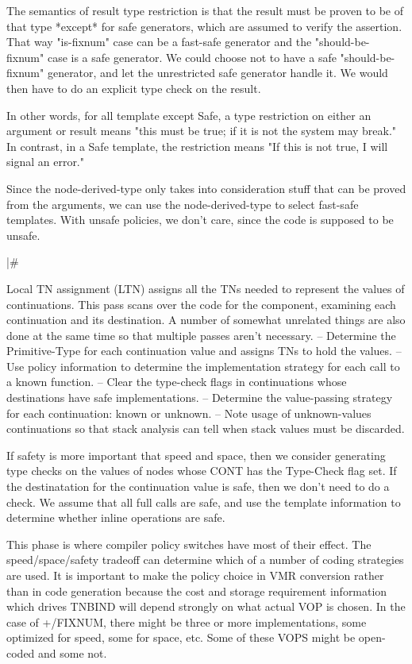     The semantics of result type restriction is that the result must be proven
    to be of that type *except* for safe generators, which are assumed to
    verify the assertion.  That way "is-fixnum" case can be a fast-safe
    generator and the "should-be-fixnum" case is a safe generator.  We could
    choose not to have a safe "should-be-fixnum" generator, and let the
    unrestricted safe generator handle it.  We would then have to do an
    explicit type check on the result.

    In other words, for all template except Safe, a type restriction on either
    an argument or result means "this must be true; if it is not the system may
    break."  In contrast, in a Safe template, the restriction means "If this is
    not true, I will signal an error."

    Since the node-derived-type only takes into consideration stuff that can be
    proved from the arguments, we can use the node-derived-type to select
    fast-safe templates.  With unsafe policies, we don't care, since the code
    is supposed to be unsafe.

|\#

Local TN assignment (LTN) assigns all the TNs needed to represent the values of
continuations.  This pass scans over the code for the component, examining each
continuation and its destination.  A number of somewhat unrelated things are
also done at the same time so that multiple passes aren't necessary.
 -- Determine the Primitive-Type for each continuation value and assigns TNs
    to hold the values.
 -- Use policy information to determine the implementation strategy for each
    call to a known function.
 -- Clear the type-check flags in continuations whose destinations have safe
    implementations.
 -- Determine the value-passing strategy for each continuation: known or
    unknown.
 -- Note usage of unknown-values continuations so that stack analysis can tell
    when stack values must be discarded.
 
If safety is more important that speed and space, then we consider generating
type checks on the values of nodes whose CONT has the Type-Check flag set.  If
the destinatation for the continuation value is safe, then we don't need to do
a check.  We assume that all full calls are safe, and use the template
information to determine whether inline operations are safe.

This phase is where compiler policy switches have most of their effect.  The
speed/space/safety tradeoff can determine which of a number of coding
strategies are used.  It is important to make the policy choice in VMR
conversion rather than in code generation because the cost and storage
requirement information which drives TNBIND will depend strongly on what actual
VOP is chosen.  In the case of +/FIXNUM, there might be three or more
implementations, some optimized for speed, some for space, etc.  Some of these
VOPS might be open-coded and some not.

